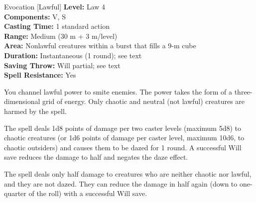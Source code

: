 {Evocation [Lawful]}
{
	\textbf{Level:}
	Law 4\\
	\textbf{Components:}
	V, S\\
	\textbf{Casting Time:}
	1 standard action\\
	\textbf{Range:}
	Medium (30 m + 3 m/level)\\
	\textbf{Area:}
	Nonlawful creatures within a burst that fills a 9-m cube\\
	\textbf{Duration:}
	Instantaneous (1 round); see text\\
	\textbf{Saving Throw:}
	Will partial; see text\\
	\textbf{Spell Resistance:}
	Yes\\
}
{
	You channel lawful power to smite enemies. The power takes the form of a three-dimensional grid of energy. Only chaotic and neutral (not lawful) creatures are harmed by the spell.

	The spell deals 1d8 points of damage per two caster levels (maximum 5d8) to chaotic creatures (or 1d6 points of damage per caster level, maximum 10d6, to chaotic outsiders) and causes them to be dazed for 1 round. A successful Will save reduces the damage to half and negates the daze effect.

	The spell deals only half damage to creatures who are neither chaotic nor lawful, and they are not dazed. They can reduce the damage in half again (down to one-quarter of the roll) with a successful Will save.

}
